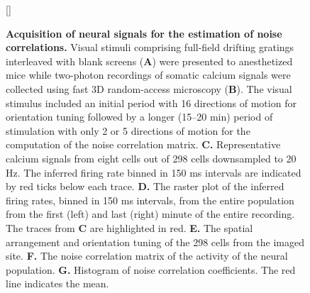 \documentclass[10pt]{article}
\begin{document}
\begin{figure}
    [\FBwidth]
    {\caption{{\bf Acquisition of neural signals for the estimation of noise correlations.}
    Visual stimuli comprising full-field drifting gratings interleaved with blank screens ({\bf A}) were presented to anesthetized mice while two-photon recordings of somatic calcium signals were collected using fast 3D random-access microscopy ({\bf B}). The visual stimulus included an initial period with 16 directions of motion for orientation tuning followed by a longer (15--20 min) period of stimulation with only 2 or 5 directions of motion for the computation of the noise correlation matrix. 
    {\bf C.} Representative calcium signals from eight cells out of 298 cells downsampled to 20 Hz. The inferred firing rate binned in 150 ms intervals are indicated by red ticks below each trace.
    {\bf D.} The raster plot of the inferred firing rates, binned in 150 ms intervals, from the entire population from the first (left) and last (right) minute of the entire recording.  The traces from {\bf C} are highlighted in red.
    {\bf E.} The spatial arrangement and orientation tuning of the 298 cells from the imaged site.
    {\bf F.} The noise correlation matrix of the activity of the neural population. 
    {\bf G.} Histogram of noise correlation coefficients. The red line indicates the mean.
} \label{fig:03}}

\end{figure}
\end{document}
